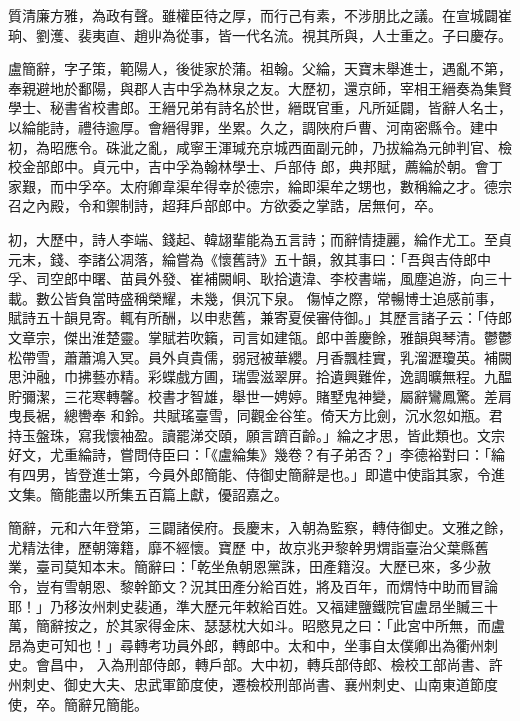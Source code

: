 \begin{pinyinscope}
 質清廉方雅，為政有聲。雖權臣待之厚，而行己有素，不涉朋比之議。在宣城闢崔珦、劉濩、裴夷直、趙丱為從事，皆一代名流。視其所與，人士重之。子曰慶存。



 盧簡辭，字子策，範陽人，後徙家於蒲。祖翰。父綸，天寶末舉進士，遇亂不第，奉親避地於鄱陽，與郡人吉中孚為林泉之友。大歷初，還京師，宰相王縉奏為集賢學士、秘書省校書郎。王縉兄弟有詩名於世，縉既官重，凡所延闢，皆辭人名士，以綸能詩，禮待逾厚。會縉得罪，坐累。久之，調陜府戶曹、河南密縣令。建中初，為昭應令。硃泚之亂，咸寧王渾瑊充京城西面副元帥，乃拔綸為元帥判官、檢校金部郎中。貞元中，吉中孚為翰林學士、戶部侍
 郎，典邦賦，薦綸於朝。會丁家艱，而中孚卒。太府卿韋渠牟得幸於德宗，綸即渠牟之甥也，數稱綸之才。德宗召之內殿，令和禦制詩，超拜戶部郎中。方欲委之掌誥，居無何，卒。



 初，大歷中，詩人李端、錢起、韓翃輩能為五言詩；而辭情捷麗，綸作尤工。至貞元末，錢、李諸公凋落，綸嘗為《懷舊詩》五十韻，敘其事曰：「吾與吉侍郎中孚、司空郎中曙、苗員外發、崔補闕峒、耿拾遺湋、李校書端，風塵追游，向三十載。數公皆負當時盛稱榮耀，未幾，俱沉下泉。
 傷悼之際，常暢博士追感前事，賦詩五十韻見寄。輒有所酬，以申悲舊，兼寄夏侯審侍御。」其歷言諸子云：「侍郎文章宗，傑出淮楚靈。掌賦若吹籟，司言如建瓴。郎中善慶餘，雅韻與琴清。鬱鬱松帶雪，蕭蕭鴻入冥。員外貞貴儒，弱冠被華纓。月香飄桂實，乳溜瀝瓊英。補闕思沖融，巾拂藝亦精。彩蝶戲方圃，瑞雲滋翠屏。拾遺興難侔，逸調曠無程。九醖貯彌潔，三花寒轉馨。校書才智雄，舉世一娉婷。賭墅鬼神變，屬辭鸞鳳驚。差肩曳長裾，總轡奉
 和鈴。共賦瑤臺雪，同觀金谷笙。倚天方比劍，沉水忽如瓶。君持玉盤珠，寫我懷袖盈。讀罷涕交頤，願言躋百齡。」綸之才思，皆此類也。文宗好文，尤重綸詩，嘗問侍臣曰：「《盧綸集》幾卷？有子弟否？」李德裕對曰：「綸有四男，皆登進士第，今員外郎簡能、侍御史簡辭是也。」即遣中使詣其家，令進文集。簡能盡以所集五百篇上獻，優詔嘉之。



 簡辭，元和六年登第，三闢諸侯府。長慶末，入朝為監察，轉侍御史。文雅之餘，尤精法律，歷朝簿籍，靡不經懷。寶歷
 中，故京兆尹黎幹男煟詣臺治父葉縣舊業，臺司莫知本末。簡辭曰：「乾坐魚朝恩黨誅，田產籍沒。大歷已來，多少赦令，豈有雪朝恩、黎幹節文？況其田產分給百姓，將及百年，而煟恃中助而冒論耶！」乃移汝州刺史裴通，準大歷元年敕給百姓。又福建鹽鐵院官盧昂坐贓三十萬，簡辭按之，於其家得金床、瑟瑟枕大如斗。昭愍見之曰：「此宮中所無，而盧昂為吏可知也！」尋轉考功員外郎，轉郎中。太和中，坐事自太僕卿出為衢州刺史。會昌中，
 入為刑部侍郎，轉戶部。大中初，轉兵部侍郎、檢校工部尚書、許州刺史、御史大夫、忠武軍節度使，遷檢校刑部尚書、襄州刺史、山南東道節度使，卒。簡辭兄簡能。




\end{pinyinscope}
